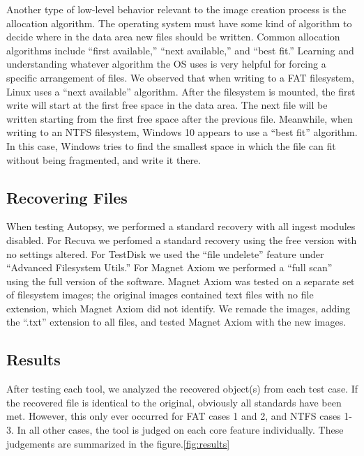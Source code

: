 Another type of low-level behavior relevant to the image creation process is the allocation algorithm. The operating system must have some kind of algorithm to decide where in the data area new files should be written. Common allocation algorithms include ``first available,'' ``next available,'' and ``best fit.'' %
Learning and understanding whatever algorithm the OS uses is very helpful for forcing a specific arrangement of files. We observed that when writing to a FAT filesystem, Linux uses a ``next available'' algorithm. After the filesystem is mounted, the first write will start at the first free space in the data area. The next file will be written starting from the first free space after the previous file.
Meanwhile, when writing to an NTFS filesystem, Windows 10 appears to use a ``best fit'' algorithm. In this case, Windows tries to find the smallest space in which the file can fit without being fragmented, and write it there.


\subsection{Recovering Files}

When testing Autopsy, we performed a standard recovery with all ingest modules disabled.
For Recuva we perfomed a standard recovery using the free version with no settings altered.
For TestDisk we used the ``file undelete'' feature under ``Advanced Filesystem Utils.''
For Magnet Axiom we performed a ``full scan'' using the full version of the software. Magnet Axiom was tested on a separate set of filesystem images; the original images contained text files with no file extension, which Magnet Axiom did not identify. We remade the images, adding the ``.txt'' extension to all files, and tested Magnet Axiom with the new images.

\subsection{Results}

After testing each tool, we analyzed the recovered object(s) from each test case. If the recovered file is identical to the original, obviously all standards have been met. However, this only ever occurred for FAT cases 1 and 2, and NTFS cases 1-3. In all other cases, the tool is judged on each core feature individually. These judgements are summarized in the figure.\ref{fig:results}

